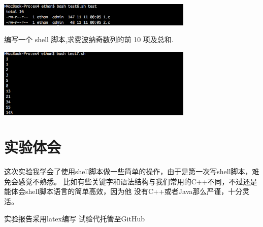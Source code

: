 \documentclass{JNUexp}
\begin{document}
\begin{image}
    \begin{center}
        \includegraphics[width=0.7\textwidth]{5}
    \end{center}
\end{image}
\begin{problem}
    编写一个 shell 脚本,求费波纳奇数列的前 10 项及总和.
\end{problem}

\begin{answer}
    
\end{answer}

\begin{image}
    \begin{center}
        \includegraphics[width=0.7\textwidth]{6}
    \end{center}
\end{image}


\section{实验体会}

这次实验我学会了使用shell脚本做一些简单的操作，由于是第一次写shell脚本，难免会感觉不熟悉。
比如有些关键字和语法结构与我们常用的C++不同，不过还是能体会shell脚本语言的简单高效，因为他
没有C++或者Java那么严谨，十分灵活。

实验报告采用latex编写
试验代托管至GitHub
\end{document}
